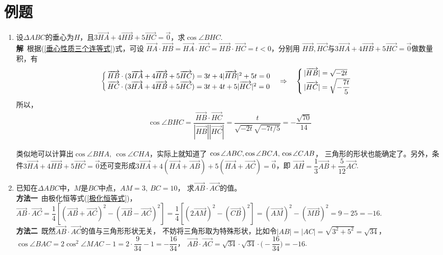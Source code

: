 \section{例题}

\begin{enumerate}[label={【\textbf{例\thechapter.\arabic*}】},
 leftmargin=\inteval{\myenumleftmargin}pt,
 itemsep=\inteval{\myenumitempsep}pt,
 itemindent=\inteval{\myenumitemindent}pt]
\item 设$ \Delta ABC $的垂心为$ H $，且$ 3\vec{HA}+4\vec{HB}
+5\vec{HC}=\vec{0} $，求$ \cos\angle BHC $. \\
\textbf{解}\ 根据(\ref{垂心性质三个连等式})式，可设 $ \vec{HA}\cdot
\vec{HB}=\vec{HA}
\cdot\vec{HC}=\vec{HB}\cdot \vec{HC}=t<0 $，分别用
$ \vec{HB},\vec{HC} $与$ 3\vec{HA}+
4\vec{HB} +5\vec{HC}=\vec{0} $做数量积，有
\begin{gather*}
    \begin{cases}
        \overrightarrow{HB}\cdot (3\overrightarrow{HA}+4\overrightarrow{HB} +5\overrightarrow{HC})=
        3t+4|\overrightarrow{HB}|^2+5t= 0 \\
        \overrightarrow{HC}\cdot (3\overrightarrow{HA}+4\overrightarrow{HB} +5\overrightarrow{HC})=
        3t+4t+5|\overrightarrow{HC}|^2= 0 
    \end{cases} \Rightarrow \quad 
    \begin{cases}
        |\overrightarrow{HB}|=\sqrt{-2t}\\
        |\overrightarrow{HC}|=\sqrt{-\dfrac{7t}{5}}
    \end{cases}
\end{gather*}
所以，
\begin{gather*}
    \cos\angle BHC=\dfrac{\vec{HB}\cdot \vec{HC}}
    {|\vec{HB}||\vec{HC}|}=\dfrac{t}{\sqrt{-2t}\sqrt{-7t/5}}
    =-\dfrac{\sqrt{70}}{14} 
\end{gather*}

类似地可以计算出$ \cos\angle BHA,\ \cos\angle CHA $，实际上就知道了
$ \cos\angle ABC,\cos\angle BCA,\\ \cos\angle CAB $，
三角形的形状也能确定了。另外，条件$ 3\vec{HA}+4\vec{HB}
+5\vec{HC}=\vec{0} $还可变形成$ 3\vec{HA}+4(\vec{HA}+\vec{AB})
+5(\vec{HA}+\vec{AC})=\vec{0} $，即
$ \vec{AH}=\dfrac{1}{3}\vec{AB}+\dfrac{5}{12}\vec{AC}$.

\item 已知在$ \Delta ABC $中，$ M $是$ BC $中点，$ AM=3,\ BC=10 $，
求$ \vec{AB}\cdot \vec{AC} $的值。\\
\textbf{方法一}\ 由极化恒等式(\ref{极化恒等式})，$ \vec{AB}\cdot 
\vec{AC}=\dfrac{1}{4}[(\vec{AB}+\vec{AC})^2-
(\vec{AB}-\vec{AC})^2]=\dfrac{1}{4}[(2\vec{AM})^2-
(\vec{CB})^2]=(\vec{AM})^2-(\vec{MB})^2=9-25=-16 $. \\
\textbf{方法二}\ 既然$ \vec{AB}\cdot \vec{AC} $的值与三角形形状无关，
不妨将三角形取为特殊形状，比如令$ |AB|=|AC|=\sqrt{3^2+5^2}=\sqrt{34} $，
$ \cos\angle BAC=2\cos^2\angle MAC-1=2\cdot \dfrac{9}{34}-1=-\dfrac{16}{34} $，
$ \vec{AB}\cdot \vec{AC}=\sqrt{34}\cdot \sqrt{34}\cdot
\Big(-\dfrac{16}{34}\Big)=-16 $.


\end{enumerate}
